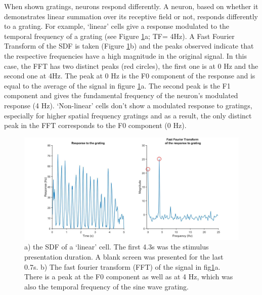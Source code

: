 	When shown gratings, neurons respond differently. A neuron, based on whether it demonstrates linear summation over its receptive field or not, responds differently to a grating. For example, ‘linear’ cells give a response modulated to the temporal frequency of a grating (see Figure \ref{fig:fourier}a; TF= 4Hz). A Fast Fourier Transform of the SDF is taken (Figure \ref{fig:fourier}b) and the peaks observed indicate that the respective frequencies have a high magnitude in the original signal. In this case, the FFT has two distinct peaks (red circles), the first one is at 0 Hz and the second one at 4Hz. The peak at 0 Hz is the F0 component of the response and is equal to the average of the signal in figure \ref{fig:fourier}a. The second peak is the F1 component and gives the fundamental frequency of the neuron’s modulated response (4 Hz). ‘Non-linear’ cells don’t show a modulated response to gratings, especially for higher spatial frequency gratings and as a result, the only distinct peak in the FFT corresponds to the F0 component (0 Hz). 
			\begin{figure}[H]
			
			\includegraphics[width=\linewidth]{methods/Fourier.jpg}
			\caption{a) the SDF of a ‘linear’ cell. The first 4.3s was the stimulus presentation duration. A blank screen was presented for the last 0.7s. b) The fast fourier transform (FFT) of the signal in fig\ref{fig:fourier}a. There is a peak at the F0 component as well as at 4 Hz, which was also the temporal frequency of the sine wave grating.}
			\label{fig:fourier}
			\end{figure}
	
